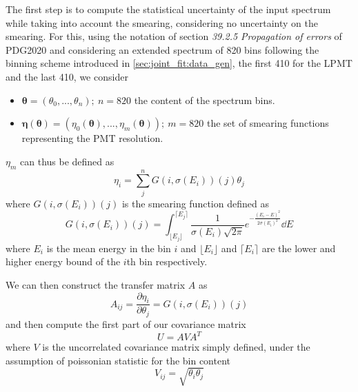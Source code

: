 \documentclass[../main.tex]{subfiles}
\begin{document}
The first step is to compute the statistical uncertainty of the input spectrum while taking into account the smearing, considering no uncertainty on the smearing. For this, using the notation of section \textit{39.2.5 Propagation of errors} of PDG2020 \cite{particle_data_group_review_2020} and considering an extended spectrum of 820 bins following the binning scheme introduced in \ref{sec:joint_fit:data_gen}, the first 410 for the LPMT and the last 410, we consider
\begin{itemize}
  \item $\bm{\theta} = (\theta_0, ..., \theta_n);~ n = 820$ the content of the spectrum bins.
  \item $\bm{\eta}(\bm{\theta}) = (\eta_0(\bm{\theta}), ..., \eta_m(\bm{\theta})); ~ m  = 820$ the set of smearing functions representing the PMT resolution.
\end{itemize}

$\eta_m$ can thus be defined as
\begin{equation}
  \label{eq:joint_fit:cov_ana:eta}
  \eta_i  = \sum_j^n G(i, \sigma(E_i))(j) \theta_j
\end{equation}
where $G(i, \sigma(E_i))(j)$ is the smearing function defined as
\begin{equation}
  G(i, \sigma(E_i))(j) = \int_{\lfloor E_j\rfloor}^{\lceil E_j \rceil} \frac{1}{\sigma(E_i)\sqrt{2\pi}} e^{-\frac{(E_i-E)^2}{2\sigma(E_i)^2}} \dd{E}
\end{equation}
where $E_i$ is the mean energy in the bin $i$ and $\lfloor E_i\rfloor$ and $\lceil E_i \rceil$ are the lower and higher energy bound of the $i$th bin respectively.

We can then construct the transfer matrix $A$ as
\begin{equation}
  A_{ij} = \frac{\partial\eta_i}{\partial\theta_j} = G(i, \sigma(E_i))(j)
\end{equation}
and then compute the first part of our covariance matrix
\begin{equation}
  U = AVA^T
\end{equation}
where $V$ is the uncorrelated covariance matrix simply defined, under the assumption of poissonian statistic for the bin content
\begin{equation}
  V_{ij} = \sqrt{\theta_i \theta_j}
\end{equation}
\end{document}
